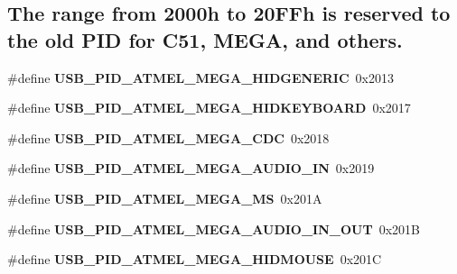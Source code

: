 \subsection*{The range from 2000h to 20\+F\+Fh is reserved to the old P\+ID for C51, M\+E\+GA, and others.}
\begin{DoxyCompactItemize}
\item 
\mbox{\label{group__usb__atmel__ids__group_gae24888f62e3e64cb01fde415bf712964}} 
\#define {\bfseries U\+S\+B\+\_\+\+P\+I\+D\+\_\+\+A\+T\+M\+E\+L\+\_\+\+M\+E\+G\+A\+\_\+\+H\+I\+D\+G\+E\+N\+E\+R\+IC}~0x2013
\item 
\mbox{\label{group__usb__atmel__ids__group_ga6ffa25d6fd7b99faffb10811165a5cbc}} 
\#define {\bfseries U\+S\+B\+\_\+\+P\+I\+D\+\_\+\+A\+T\+M\+E\+L\+\_\+\+M\+E\+G\+A\+\_\+\+H\+I\+D\+K\+E\+Y\+B\+O\+A\+RD}~0x2017
\item 
\mbox{\label{group__usb__atmel__ids__group_ga433805be6787a174140c0b140cd3b19c}} 
\#define {\bfseries U\+S\+B\+\_\+\+P\+I\+D\+\_\+\+A\+T\+M\+E\+L\+\_\+\+M\+E\+G\+A\+\_\+\+C\+DC}~0x2018
\item 
\mbox{\label{group__usb__atmel__ids__group_ga691d09a8572063b5408687f3c0812397}} 
\#define {\bfseries U\+S\+B\+\_\+\+P\+I\+D\+\_\+\+A\+T\+M\+E\+L\+\_\+\+M\+E\+G\+A\+\_\+\+A\+U\+D\+I\+O\+\_\+\+IN}~0x2019
\item 
\mbox{\label{group__usb__atmel__ids__group_gac3fdf47be4d8a57253ea554c086890a2}} 
\#define {\bfseries U\+S\+B\+\_\+\+P\+I\+D\+\_\+\+A\+T\+M\+E\+L\+\_\+\+M\+E\+G\+A\+\_\+\+MS}~0x201A
\item 
\mbox{\label{group__usb__atmel__ids__group_ga3e31683337b6ffe668a82e4b0665033a}} 
\#define {\bfseries U\+S\+B\+\_\+\+P\+I\+D\+\_\+\+A\+T\+M\+E\+L\+\_\+\+M\+E\+G\+A\+\_\+\+A\+U\+D\+I\+O\+\_\+\+I\+N\+\_\+\+O\+UT}~0x201B
\item 
\mbox{\label{group__usb__atmel__ids__group_ga262ddbd401f791b4e05bd9d0691b5524}} 
\#define {\bfseries U\+S\+B\+\_\+\+P\+I\+D\+\_\+\+A\+T\+M\+E\+L\+\_\+\+M\+E\+G\+A\+\_\+\+H\+I\+D\+M\+O\+U\+SE}~0x201C

\end{DoxyCompactItemize}
